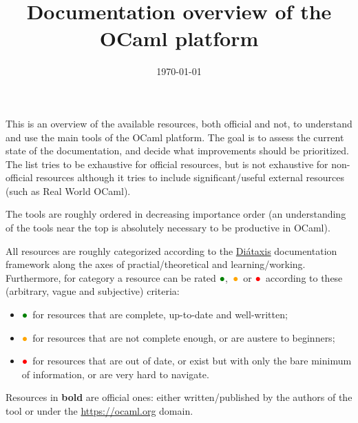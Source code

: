 \documentclass{article}
\title{Documentation overview of the OCaml platform}
\date{\today}
\newcommand{\good}{\textcolor{green}{●}}
\newcommand{\meh}{\textcolor{orange}{●}}
\newcommand{\bad}{\textcolor{red}{●}}
\begin{document}
\maketitle
This is an overview of the available resources, both official and not, to
understand and use the main tools of the OCaml platform. The goal is to assess
the current state of the documentation, and decide what improvements should be
prioritized. The list tries to be exhaustive for official resources, but is not
exhaustive for non-official resources although it tries to include
significant/useful external resources (such as Real World OCaml).

The tools are roughly ordered in decreasing importance order (an understanding
of the tools near the top is absolutely necessary to be productive in OCaml).

All resources are roughly categorized according to the
\href{https://diataxis.fr/}{Diátaxis} documentation framework along the axes of
practial/theoretical and learning/working. Furthermore, for category a resource
can be rated \good,~\meh~or \bad~according to these (arbitrary, vague and
subjective) criteria:
\begin{itemize}
  \item \good~for resources that are complete, up-to-date and well-written;
  \item \meh~for resources that are not complete enough, or are austere to
    beginners;
  \item \bad~for resources that are out of date, or exist but with only the bare
    minimum of information, or are very hard to navigate.
\end{itemize}

Resources in \textbf{bold} are official ones: either written/published by the
authors of the tool or under the \url{https://ocaml.org} domain.
\end{document}
